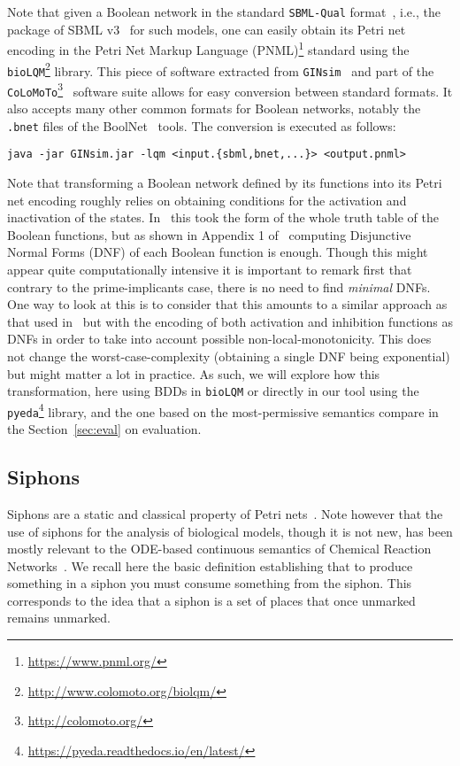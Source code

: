 \documentclass[preprint,12pt]{elsarticle}
\begin{document}
Note that given a Boolean network in the standard \texttt{SBML-Qual} format~\cite{chaouiya2013sbml}, i.e., the package of SBML v3~\cite{keating2020sbml} for such models, one can easily obtain its Petri net encoding in the Petri Net Markup Language  (PNML)\footnote{\url{https://www.pnml.org/}} standard using the \texttt{bioLQM}\footnote{\url{http://www.colomoto.org/biolqm/}} library.
This piece of software extracted from \texttt{GINsim}~\cite{chaouiya2012logical} and part of the \texttt{CoLoMoTo}\footnote{\url{http://colomoto.org/}}~\cite{naldi2015cooperative} software suite allows for easy conversion between standard formats.
It also accepts many other common formats for Boolean networks, notably the \verb|.bnet| files of the  BoolNet~\cite{mussel2010boolnet,klarner2017pyboolnet} tools.
The conversion is executed as follows:

{\small \verb|java -jar GINsim.jar -lqm <input.{sbml,bnet,...}> <output.pnml>|}

Note that transforming a Boolean network defined by its functions into its Petri net encoding roughly relies on obtaining conditions for the activation and inactivation of the states. In~\cite{chaouiya2004qualitative} this took the form of the whole truth table of the Boolean functions, but as shown in Appendix 1 of~\cite{chatain2014characterization} computing Disjunctive Normal Forms (DNF) of each Boolean function is enough.
Though this might appear quite computationally intensive it is important to remark first that contrary to the prime-implicants case, there is no need to find \emph{minimal} DNFs.
One way to look at this is to consider that this amounts to a similar approach as that used in~\cite{DBLP:conf/ictai/ChevalierFPZ19} but with the encoding of both activation and inhibition functions as DNFs in order to take into account possible non-local-monotonicity.
This does not change the worst-case-complexity (obtaining a single DNF being exponential) but might matter a lot in practice.
As such, we will explore how this transformation, here using BDDs in \texttt{bioLQM} or directly in our tool using the \texttt{pyeda}\footnote{\url{https://pyeda.readthedocs.io/en/latest/}} library, and the one based on the most-permissive semantics compare in the Section~\ref{sec:eval} on evaluation.


\subsection{Siphons}

Siphons are a static and classical property of Petri nets~\cite{peterson1981petri}.
Note however that the use of siphons for the analysis of biological models, though it is not new, has been mostly relevant to the ODE-based continuous semantics of Chemical Reaction Networks~\cite{angeli2007petri,angeli2011persistence,degrand2020graphical}.
We recall here the basic definition establishing that to produce something in a siphon you must consume something from the siphon.
This corresponds to the idea that a siphon is a set of places that once unmarked remains unmarked.
\end{document}
